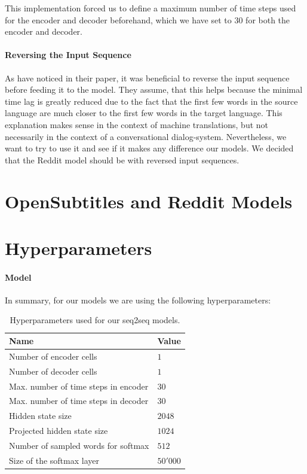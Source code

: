 This implementation forced us to define a maximum number of time steps used for the encoder and decoder beforehand, which we have set to $30$ for both the encoder and decoder.

\paragraph{Reversing the Input Sequence} As \cite{Sutskever:2014} have noticed in their paper, it was beneficial to reverse the input sequence before feeding it to the model. They assume, that this helps because the minimal time lag \cite{Hochreiter:1997} is greatly reduced due to the fact that the first few words in the source language are much closer to the first few words in the target language. This explanation makes sense in the context of machine translations, but not necessarily in the context of a conversational dialog-system. Nevertheless, we want to try to use it and see if it makes any difference our models. We decided that the Reddit model should be with reversed input sequences.

\section{OpenSubtitles and Reddit Models} \blindtext

\section{Hyperparameters}
\label{methods:hyperparameters}

\paragraph{Model} In summary, for our models we are using the following hyperparameters:

\begin{table}[H]
	\centering
	\begin{adjustbox}{max width=\textwidth}
		\begin{tabular}{ll}
			\toprule
			Name & Value\\ \midrule
			Number of encoder cells & $1$\\
			Number of decoder cells & $1$\\
			Max. number of time steps in encoder & $30$\\
			Max. number of time steps in decoder & $30$\\
			Hidden state size & $2048$\\
			Projected hidden state size & $1024$\\
			Number of sampled words for softmax & $512$\\
			Size of the softmax layer & $50'000$\\
			\bottomrule
		\end{tabular}
	\end{adjustbox}
	\caption{Hyperparameters used for our seq2seq models.}
	\label{methods:hyperparameters:table}
\end{table}

